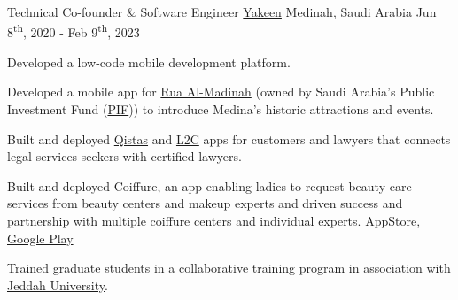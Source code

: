 \begin{cventries}

    \cventry
    {Technical Co-founder \& Software Engineer}
    {\href{https://youtube.com/@yakeenapp5784?si=Us7PbvvqiMXWP_8J}{Yakeen}}
    {Medinah, Saudi Arabia}
    {Jun 8\textsuperscript{th}, 2020 - Feb 9\textsuperscript{th}, 2023}
    {
        \begin{cvitems}
            \item {Developed a low-code mobile development platform.}
            \item {Developed a mobile app for \href{https://www.ruaalmadinah.com}{Rua Al-Madinah} (owned by Saudi Arabia's Public Investment Fund (\href{https://www.pif.gov.sa/en}{PIF})) to introduce Medina's historic attractions and events.}
            \item {Built and deployed \href{https://apps.apple.com/us/app/qistas-قسطاس/id1626612024}{Qistas} and \href{https://apps.apple.com/us/app/l2c/id1626615375}{L2C} apps for customers and lawyers that connects legal services seekers with certified lawyers.}
            \item {Built and deployed Coiffure, an app enabling ladies to request beauty care services from beauty centers and makeup experts and driven success and partnership with multiple coiffure centers and individual experts. \href{https://apps.apple.com/us/app/coiffure/id1615277368?uo=2}{AppStore}, \href{https://play.google.com/store/apps/details?id=com.flutterflow.kwafira}{Google Play}}
            \item {Trained graduate students in a collaborative training program in association with \href{https://uj.edu.sa}{Jeddah University}.}
        \end{cvitems}
    }


\end{cventries}
